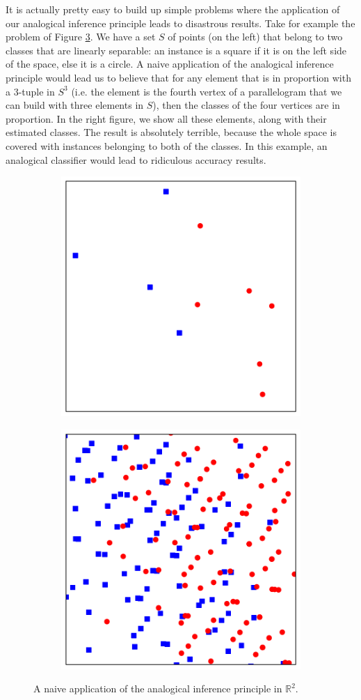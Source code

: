 It is actually pretty easy to build up simple problems where the application of
our analogical inference principle leads to disastrous results.  Take for
example the problem of Figure \ref{FIG:classif_in_R2}. We have a set $S$ of
points (on the left) that belong to two classes that are linearly separable: an
instance is a square if it is on the left side of the space, else it is a
circle. A naive application of the analogical inference principle would lead us
to believe that for any element that is in proportion with a $3$-tuple in $S^3$
(i.e. the element is the fourth vertex of a parallelogram that we can build
with three elements in $S$), then the classes of the four vertices are in
proportion. In the right figure, we show all these elements, along with their
estimated classes. The result is absolutely terrible, because the whole space
is covered with instances belonging to both of the classes. In this example,
an analogical classifier would lead to ridiculous accuracy results.

\begin{figure}
\centering
\begin{subfigure}{.5\textwidth}
  \centering
  \includegraphics[width=.6\linewidth]{figures/AE_in_R2_S.pdf}
  \label{fig:sub1}
\end{subfigure}%
\begin{subfigure}{.5\textwidth}
  \centering
  \includegraphics[width=.6\linewidth]{figures/AE_in_R2_AE.pdf}
  \label{fig:sub2}
\end{subfigure}
  \caption{A naive application of the analogical inference principle in
  $\mathbb{R}^2$.}
\label{FIG:classif_in_R2}
\end{figure}

